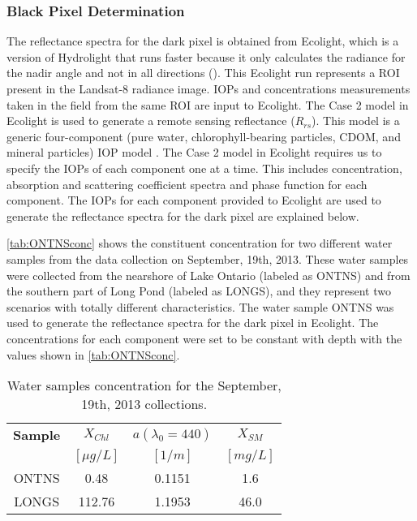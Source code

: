 \subsubsection{Black Pixel Determination}
\label{subsubsec:blackpixel}

The reflectance spectra for the dark pixel is obtained from Ecolight, which is a version of Hydrolight that runs faster because it only calculates the radiance for the nadir angle and not in all directions (\cite{MobleyHEtech}). This Ecolight run represents a ROI present in the Landsat-8 radiance image. IOPs and concentrations measurements taken in the field from the same ROI are input to Ecolight. The Case 2 model in Ecolight is used to generate a remote sensing reflectance ($R_{rs}$). This model is a generic four-component (pure water, chlorophyll-bearing particles, CDOM, and mineral particles) IOP model \cite{MobleyHEtech}. The Case 2 model in Ecolight requires us to specify the IOPs of each component one at a time. This includes concentration, absorption and scattering coefficient spectra and phase function for each component. The IOPs for each component provided to Ecolight are used to generate the reflectance spectra for the dark pixel are explained below.

\autoref{tab:ONTNSconc} shows the constituent concentration for two different water samples from the data collection on September, 19th, 2013. These water samples were collected from the nearshore of Lake Ontario (labeled as ONTNS) and from the southern part of Long Pond (labeled as LONGS), and they represent two scenarios with totally different characteristics. The water sample ONTNS was used to generate the reflectance spectra for the dark pixel in Ecolight. The concentrations for each component were set to be constant with depth with the values shown in \autoref{tab:ONTNSconc}. 
\vspace{.5cm}
\begin{table}[!ht]
\caption{ Water samples concentration for the September, 19th, 2013 collections. \label{tab:ONTNSconc} } 
\centering
\begin{tabular}{c|c|c|c} 
 \bfseries{Sample} & \bfseries{$X_{Chl}$} & \bfseries{$a(\lambda_0=440)$}& \bfseries{$X_{SM}$}\\
 & $[\mu g/L]$ & $[1/m]$ & $[mg/L]$ \\ \hline \hline
ONTNS & 0.48 & 0.1151 & 1.6\\ 
LONGS & 112.76 & 1.1953 & 46.0\\ 
 \end{tabular}
\end{table}

